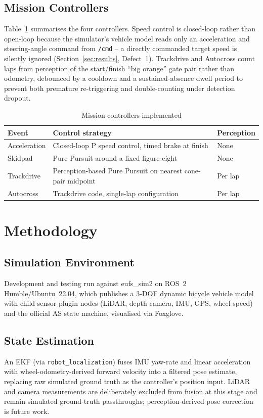 \documentclass[conference]{IEEEtran}
\begin{document}
\subsection{Mission Controllers}
Table~\ref{tab:controllers} summarises the four controllers. Speed control is closed-loop rather than open-loop because the simulator's vehicle model reads only an acceleration and steering-angle command from \texttt{/cmd} -- a directly commanded target speed is silently ignored (Section~\ref{sec:results}, Defect~1). Trackdrive and Autocross count laps from perception of the start/finish ``big orange'' gate pair rather than odometry, debounced by a cooldown and a sustained-absence dwell period to prevent both premature re-triggering and double-counting under detection dropout.

\begin{table}[t]
\centering
\caption{Mission controllers implemented}
\label{tab:controllers}
\begin{tabular}{@{}p{1.5cm}p{4cm}p{1.6cm}@{}}
\toprule
\textbf{Event} & \textbf{Control strategy} & \textbf{Perception} \\
\midrule
Acceleration & Closed-loop P speed control, timed brake at finish & None \\
Skidpad & Pure Pursuit around a fixed figure-eight & None \\
Trackdrive & Perception-based Pure Pursuit on nearest cone-pair midpoint & Per lap \\
Autocross & Trackdrive code, single-lap configuration & Per lap \\
\bottomrule
\end{tabular}
\end{table}

\section{Methodology}

\subsection{Simulation Environment}
Development and testing run against eufs\_sim2 on ROS~2 Humble/Ubuntu~22.04, which publishes a 3-DOF dynamic bicycle vehicle model with child sensor-plugin nodes (LiDAR, depth camera, IMU, GPS, wheel speed) and the official AS state machine, visualised via Foxglove.

\subsection{State Estimation}
An EKF (via \texttt{robot\_localization}) fuses IMU yaw-rate and linear acceleration with wheel-odometry-derived forward velocity into a filtered pose estimate, replacing raw simulated ground truth as the controller's position input. LiDAR and camera measurements are deliberately excluded from fusion at this stage and remain simulated ground-truth passthroughs; perception-derived pose correction is future work.
\end{document}
